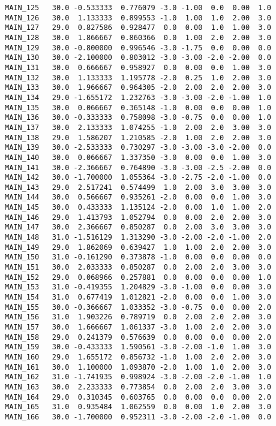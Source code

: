 \documentclass[a4paper,10pt,onecolumn,oneside,openright]{article}
\begin{document}
\begin{verbatim}
MAIN_125   30.0 -0.533333  0.776079 -3.0 -1.00  0.0  0.00  1.0
MAIN_126   30.0  1.133333  0.899553 -1.0  1.00  1.0  2.00  3.0
MAIN_127   29.0  0.827586  0.928477  0.0  0.00  1.0  1.00  3.0
MAIN_128   30.0  1.866667  0.860366  0.0  1.00  2.0  2.00  3.0
MAIN_129   30.0 -0.800000  0.996546 -3.0 -1.75  0.0  0.00  0.0
MAIN_130   30.0 -2.100000  0.803012 -3.0 -3.00 -2.0 -2.00  0.0
MAIN_131   30.0  0.666667  0.958927  0.0  0.00  0.0  1.00  3.0
MAIN_132   30.0  1.133333  1.195778 -2.0  0.25  1.0  2.00  3.0
MAIN_133   30.0  1.966667  0.964305 -2.0  2.00  2.0  2.00  3.0
MAIN_134   29.0 -1.655172  1.232763 -3.0 -3.00 -2.0 -1.00  1.0
MAIN_135   30.0  0.066667  0.365148 -1.0  0.00  0.0  0.00  1.0
MAIN_136   30.0 -0.333333  0.758098 -3.0 -0.75  0.0  0.00  1.0
MAIN_137   30.0  2.133333  1.074255 -1.0  2.00  2.0  3.00  3.0
MAIN_138   29.0  1.586207  1.210585 -2.0  1.00  2.0  2.00  3.0
MAIN_139   30.0 -2.533333  0.730297 -3.0 -3.00 -3.0 -2.00  0.0
MAIN_140   30.0  0.066667  1.337350 -3.0  0.00  0.0  1.00  3.0
MAIN_141   30.0 -2.366667  0.764890 -3.0 -3.00 -2.5 -2.00  0.0
MAIN_142   30.0 -1.700000  1.055364 -3.0 -2.75 -2.0 -1.00  0.0
MAIN_143   29.0  2.517241  0.574499  1.0  2.00  3.0  3.00  3.0
MAIN_144   30.0  0.566667  0.935261 -2.0  0.00  0.0  1.00  3.0
MAIN_145   30.0  0.433333  1.135124 -2.0  0.00  1.0  1.00  2.0
MAIN_146   29.0  1.413793  1.052794  0.0  0.00  2.0  2.00  3.0
MAIN_147   30.0  2.366667  0.850287  0.0  2.00  3.0  3.00  3.0
MAIN_148   31.0 -1.516129  1.313290 -3.0 -2.00 -2.0 -1.00  2.0
MAIN_149   29.0  1.862069  0.639427  1.0  1.00  2.0  2.00  3.0
MAIN_150   31.0 -0.161290  0.373878 -1.0  0.00  0.0  0.00  0.0
MAIN_151   30.0  2.033333  0.850287  0.0  2.00  2.0  3.00  3.0
MAIN_152   29.0  0.068966  0.257881  0.0  0.00  0.0  0.00  1.0
MAIN_153   31.0 -0.419355  1.204829 -3.0 -1.00  0.0  0.00  3.0
MAIN_154   31.0  0.677419  1.012821 -2.0  0.00  0.0  1.00  3.0
MAIN_155   30.0 -0.366667  1.033352 -3.0 -0.75  0.0  0.00  2.0
MAIN_156   31.0  1.903226  0.789719  0.0  2.00  2.0  2.00  3.0
MAIN_157   30.0  1.666667  1.061337 -3.0  1.00  2.0  2.00  3.0
MAIN_158   29.0  0.241379  0.576639  0.0  0.00  0.0  0.00  2.0
MAIN_159   30.0 -0.433333  1.590561 -3.0 -2.00 -1.0  1.00  3.0
MAIN_160   29.0  1.655172  0.856732 -1.0  1.00  2.0  2.00  3.0
MAIN_161   30.0  1.100000  1.093870 -2.0  1.00  1.0  2.00  3.0
MAIN_162   31.0 -1.741935  0.998924 -3.0 -2.00 -2.0 -1.00  1.0
MAIN_163   30.0  2.233333  0.773854  0.0  2.00  2.0  3.00  3.0
MAIN_164   29.0  0.310345  0.603765  0.0  0.00  0.0  0.00  2.0
MAIN_165   31.0  0.935484  1.062559  0.0  0.00  1.0  2.00  3.0
MAIN_166   30.0 -1.700000  0.952311 -3.0 -2.00 -2.0 -1.00  0.0

\end{verbatim}
\end{document}

